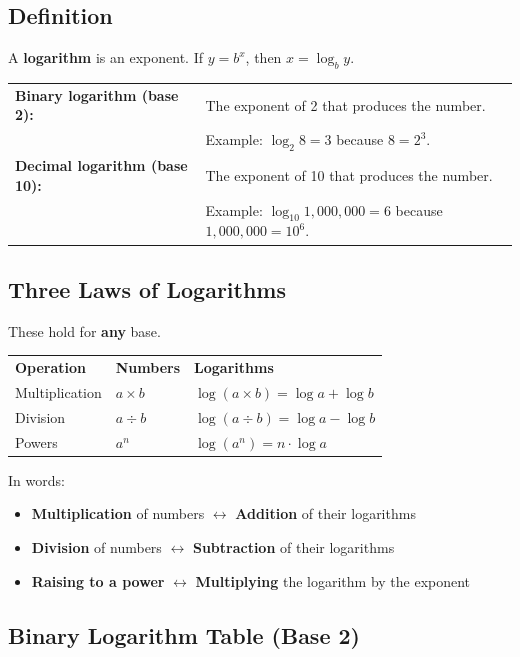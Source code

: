 \documentclass{article}
\begin{document}
\subsection*{Definition}

A \textbf{logarithm} is an exponent. If $y = b^x$, then $x = \log_b y$.

\medbreak

\begin{tabular}{ll}
\textbf{Binary logarithm (base 2):} & The exponent of 2 that produces the number. \\
& Example: $\log_2 8 = 3$ because $8 = 2^3$. \\[6pt]
\textbf{Decimal logarithm (base 10):} & The exponent of 10 that produces the number. \\
& Example: $\log_{10} 1{,}000{,}000 = 6$ because $1{,}000{,}000 = 10^6$.
\end{tabular}

\subsection*{Three Laws of Logarithms}

These hold for \textbf{any} base.

\bigbreak

\begin{tabular}{lll}
\textbf{Operation} & \textbf{Numbers} & \textbf{Logarithms} \\[6pt]
Multiplication & $a \times b$ & $\log(a \times b) = \log a + \log b$ \\[4pt]
Division & $a \div b$ & $\log(a \div b) = \log a - \log b$ \\[4pt]
Powers & $a^n$ & $\log(a^n) = n \cdot \log a$
\end{tabular}

\bigbreak

In words:
\begin{itemize}[nosep]
    \item \textbf{Multiplication} of numbers $\longleftrightarrow$ \textbf{Addition} of their logarithms
    \item \textbf{Division} of numbers $\longleftrightarrow$ \textbf{Subtraction} of their logarithms
    \item \textbf{Raising to a power} $\longleftrightarrow$ \textbf{Multiplying} the logarithm by the exponent
\end{itemize}

\subsection*{Binary Logarithm Table (Base 2)}
\end{document}
